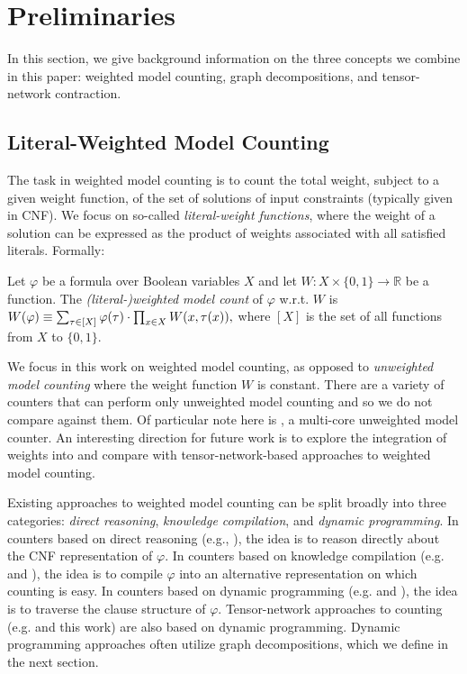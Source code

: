 \section{Preliminaries}
\label{sec:prelim}

In this section, we give background information on the three concepts we combine in this paper: weighted model counting, graph decompositions, and tensor-network contraction. %

\subsection{Literal-Weighted Model Counting}
\label{sec:wmc}
The task in weighted model counting is to count the total weight, subject to a given weight function, of the set of solutions of input constraints (typically given in CNF). We focus on so-called \emph{literal-weight functions}, where the weight of a solution can be expressed as the product of weights associated with all satisfied literals. Formally:
\begin{definition}
  Let $\varphi$ be a formula over Boolean variables $X$ and let $W: X \times \{0,1\} \rightarrow \mathbb{R}$ be a function. The \emph{(literal-)weighted model count} of $\varphi$ w.r.t. $W$ is
  $W(\varphi) \equiv \sum_{\tau \in [X]} \varphi(\tau) \cdot \prod_{x \in X} W(x, \tau(x)),$ where $[X]$ is the set of all functions from $X$ to $\{0, 1\}$.
\end{definition}

We focus in this work on weighted model counting, as opposed to \emph{unweighted model counting} where the weight function $W$ is constant. There are a variety of counters \cite{CW16,FHMW17,Thurley2006} that can perform only unweighted model counting and so we do not compare against them. Of particular note here is  \cite{BSB15}, a multi-core unweighted model counter. An interesting direction for future work is to explore the integration of weights into  and compare with tensor-network-based approaches to weighted model counting.

Existing approaches to weighted model counting can be split broadly into three categories: \emph{direct reasoning}, \emph{knowledge compilation}, and \emph{dynamic programming}. In counters based on direct reasoning (e.g.,  \cite{SBK05}), the idea is to reason directly about the CNF representation of $\varphi$. In counters based on knowledge compilation (e.g.  \cite{OD15} and  \cite{LM17}), the idea is to compile $\varphi$ into an alternative representation on which counting is easy. In counters based on dynamic programming (e.g.  \cite{DPV20} and  \cite{FHWZ18,FHZ19}), the idea is to traverse the clause structure of $\varphi$. Tensor-network approaches to counting (e.g.  \cite{DDV19} and this work) are also based on dynamic programming. Dynamic programming approaches often utilize graph decompositions, which we define in the next section. 

